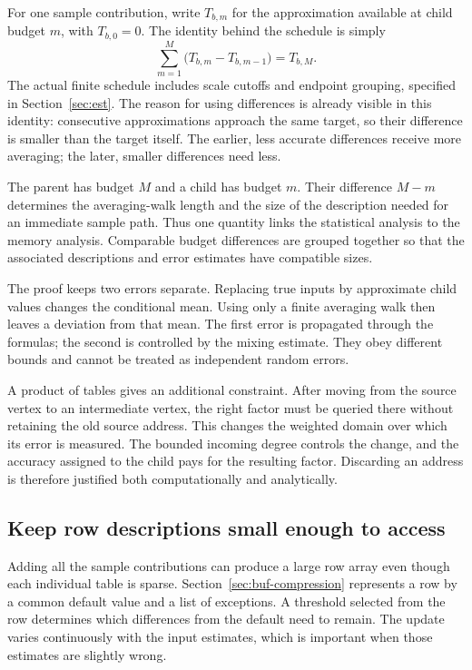 For one sample contribution, write $T_{b,m}$ for the approximation available at child budget $m$, with $T_{b,0}=0$. The identity behind the schedule is simply
\[
 \sum_{m=1}^{M}\bigl(T_{b,m}-T_{b,m-1}\bigr)=T_{b,M}.
\]
The actual finite schedule includes scale cutoffs and endpoint grouping, specified in Section~\ref{sec:est}. The reason for using differences is already visible in this identity: consecutive approximations approach the same target, so their difference is smaller than the target itself. The earlier, less accurate differences receive more averaging; the later, smaller differences need less.

The parent has budget $M$ and a child has budget $m$. Their difference $M-m$ determines the averaging-walk length and the size of the description needed for an immediate sample path. Thus one quantity links the statistical analysis to the memory analysis. Comparable budget differences are grouped together so that the associated descriptions and error estimates have compatible sizes.

The proof keeps two errors separate. Replacing true inputs by approximate child values changes the conditional mean. Using only a finite averaging walk then leaves a deviation from that mean. The first error is propagated through the formulas; the second is controlled by the mixing estimate. They obey different bounds and cannot be treated as independent random errors.

A product of tables gives an additional constraint. After moving from the source vertex to an intermediate vertex, the right factor must be queried there without retaining the old source address. This changes the weighted domain over which its error is measured. The bounded incoming degree controls the change, and the accuracy assigned to the child pays for the resulting factor. Discarding an address is therefore justified both computationally and analytically.

\subsection{Keep row descriptions small enough to access}

Adding all the sample contributions can produce a large row array even though each individual table is sparse. Section~\ref{sec:buf-compression} represents a row by a common default value and a list of exceptions. A threshold selected from the row determines which differences from the default need to remain. The update varies continuously with the input estimates, which is important when those estimates are slightly wrong.

